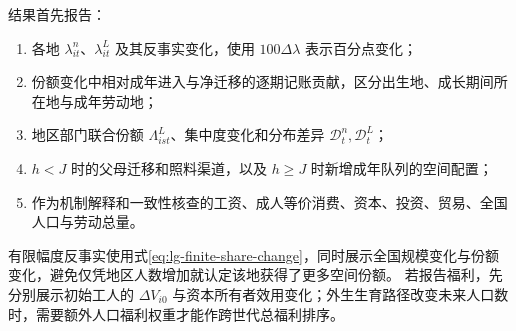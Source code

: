 \documentclass[UTF8,a4paper,zihao=-4,fontset=windows]{ctexart}
\numberwithin{equation}{section}
\begin{document}
结果首先报告：
\begin{enumerate}
 \item 各地 $\lambda^n_{it}$、$\lambda^L_{it}$ 及其反事实变化，使用 $100\Delta\lambda$ 表示百分点变化；
 \item 份额变化中相对成年进入与净迁移的逐期记账贡献，区分出生地、成长期间所在地与成年劳动地；
 \item 地区部门联合份额 $\Lambda^L_{ist}$、集中度变化和分布差异 $\mathcal D^n_t,\mathcal D^L_t$；
 \item $h<J$ 时的父母迁移和照料渠道，以及 $h\geq J$ 时新增成年队列的空间配置；
 \item 作为机制解释和一致性核查的工资、成人等价消费、资本、投资、贸易、全国人口与劳动总量。
\end{enumerate}
有限幅度反事实使用式\eqref{eq:lg-finite-share-change}，同时展示全国规模变化与份额变化，避免仅凭地区人数增加就认定该地获得了更多空间份额。
若报告福利，先分别展示初始工人的 $\Delta V_{i0}$ 与资本所有者效用变化；外生生育路径改变未来人口数时，需要额外人口福利权重才能作跨世代总福利排序。
\end{document}

